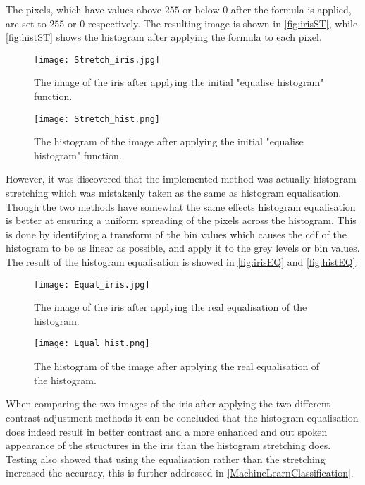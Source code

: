 The pixels, which have values above $ 255 $ or below $ 0 $ after the formula is applied, are set to $ 255 $ or $ 0 $ respectively. The resulting image is shown in \autoref{fig:irisST}, while \autoref{fig:histST} shows the histogram after applying the formula to each pixel.
\begin{figure}[h]
\centering
\texttt{[image: Stretch\_iris.jpg]}
\caption{The image of the iris after applying the initial "equalise histogram" function.}
\label{fig:irisST}
\end{figure}
\begin{figure}[h]
\centering
\texttt{[image: Stretch\_hist.png]}
\caption{The histogram of the image after applying the initial "equalise histogram" function.}
\label{fig:histST}
\end{figure}
However, it was discovered that the implemented method was actually histogram stretching which was mistakenly taken as the same as histogram equalisation. Though the two methods have somewhat the same effects histogram equalisation is better at ensuring a uniform spreading of the pixels across the histogram. 
This is done by identifying a transform of the bin values which causes the \gls{cdf} of the histogram to be as linear as possible, and apply it to the grey levels or bin values. The result of the histogram equalisation is showed in \autoref{fig:irisEQ} and \autoref{fig:histEQ}.
\begin{figure}[h]
\centering
\texttt{[image: Equal\_iris.jpg]}
\caption{The image of the iris after applying the real equalisation of the histogram.}
\label{fig:irisEQ}
\end{figure}
\begin{figure}[h]
\centering
\texttt{[image: Equal\_hist.png]}
\caption{The histogram of the image after applying the real equalisation of the histogram.}
\label{fig:histEQ}
\end{figure}
When comparing the two images of the iris after applying the two different contrast adjustment methods it can be concluded that the histogram equalisation does indeed result in better contrast and a more enhanced and out spoken appearance of the structures in the iris than the histogram stretching does. Testing also showed that using the equalisation rather than the stretching increased the accuracy, this is further addressed in \autoref{MachineLearnClassification}. 

